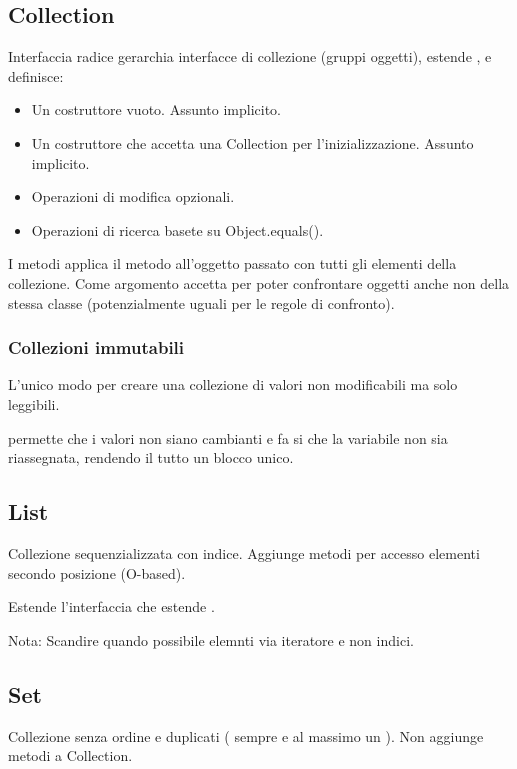 
\subsection{Collection}
Interfaccia radice gerarchia interfacce di collezione (gruppi oggetti), estende , e definisce:
\begin{itemize}
	\item Un costruttore vuoto. Assunto implicito.
	\item Un costruttore che accetta una Collection per l'inizializzazione. Assunto implicito.
	\item Operazioni di modifica opzionali.
	\item Operazioni di ricerca basete su Object.equals().
\end{itemize}


I metodi  applica il metodo  all'oggetto passato con tutti gli elementi della collezione.
Come argomento accetta  per poter confrontare oggetti anche non della stessa classe (potenzialmente uguali per le regole di confronto).

\subsubsection{Collezioni immutabili}
L'unico modo per creare una collezione di valori non modificabili ma solo leggibili.



 permette che i valori non siano cambianti e  fa si che la variabile non sia riassegnata, rendendo il tutto un blocco unico.

\subsection{List}
Collezione sequenzializzata con indice. Aggiunge metodi per accesso elementi secondo posizione (O-based).

Estende l'interfaccia  che estende .

Nota: Scandire quando possibile elemnti via iteratore e non indici.

\subsection{Set}
Collezione senza ordine e duplicati ( sempre  e al massimo un ). Non aggiunge metodi a Collection.

